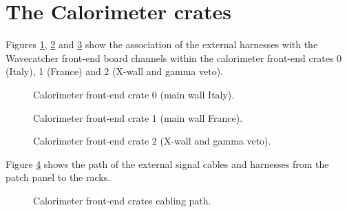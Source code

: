 
\clearpage
\section{The Calorimeter crates}

Figures  \ref{fig:calosignal:crates:0},  \ref{fig:calosignal:crates:1}
and \ref{fig:calosignal:crates:2} show the association of the external
harnesses  with the  Wavecatcher front-end  board channels  within the
calorimeter front-end crates  0 (Italy), 1 (France) and  2 (X-wall and
gamma veto).

\begin{figure}[h!]
  \begin{center}
    \scalebox{0.6}{}
  \end{center}
  \caption{Calorimeter front-end crate 0 (main wall Italy).}
  \label{fig:calosignal:crates:0}
\end{figure}

\begin{figure}[h!]
  \begin{center}
    \scalebox{0.6}{}
  \end{center}
  \caption{Calorimeter front-end crate 1 (main wall France).}
  \label{fig:calosignal:crates:1}
 
\end{figure}

\begin{figure}[h!]
  \begin{center}
    \scalebox{0.6}{}
  \end{center}
  \caption{Calorimeter front-end crate 2 (X-wall and gamma veto).}
  \label{fig:calosignal:crates:2}
 
\end{figure}

Figure  \ref{fig:calosignal:crates:3} shows the path of the
external signal cables and harnesses from the patch panel
to the racks.

\begin{figure}[h!]
  \begin{center}
    \scalebox{0.6}{}
  \end{center}
  \caption{Calorimeter front-end crates cabling path.}
  \label{fig:calosignal:crates:3}
 
\end{figure}

